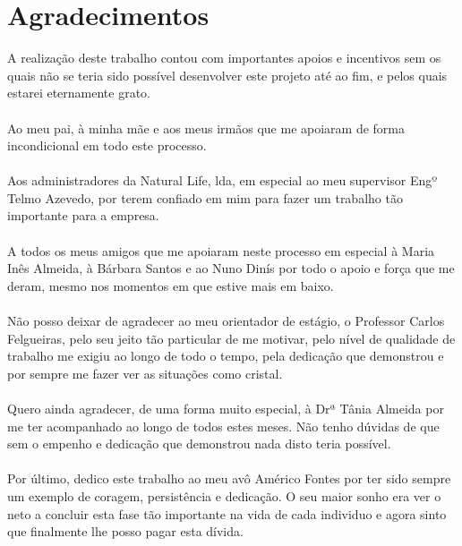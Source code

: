 \chapter*{Agradecimentos}

A realização deste trabalho contou com importantes apoios e incentivos sem os quais não se teria sido possível desenvolver este projeto até ao fim, e pelos quais estarei eternamente grato.
\\\\
Ao meu pai, à minha mãe e aos meus irmãos que me apoiaram de forma incondicional em todo este processo.
\\\\
Aos administradores da Natural Life, lda, em especial ao meu supervisor Engº Telmo Azevedo, por terem confiado em mim para fazer um trabalho tão importante para a empresa.
\\\\
A todos os meus amigos que me apoiaram neste processo em especial à Maria Inês Almeida, à Bárbara Santos e ao Nuno Dinís por todo o apoio e força que me deram, mesmo nos momentos em que estive mais em baixo.
\\\\
Não posso deixar de agradecer ao meu orientador de estágio, o Professor Carlos Felgueiras, pelo seu jeito tão particular de me motivar, pelo nível de qualidade de trabalho me exigiu ao longo de todo o tempo, pela dedicação que demonstrou e por sempre me fazer ver as situações como cristal.
\\\\
Quero ainda agradecer, de uma forma muito especial, à Drª Tânia Almeida por me ter acompanhado ao longo de todos estes meses. Não tenho dúvidas de que sem o empenho e dedicação que demonstrou nada disto teria possível.
\\\\
Por último, dedico este trabalho ao meu avô Américo Fontes por ter sido sempre um exemplo de coragem, persistência e dedicação. O seu maior sonho era ver o neto a concluir esta fase tão importante na vida de cada individuo e agora sinto que finalmente lhe posso pagar esta dívida.  